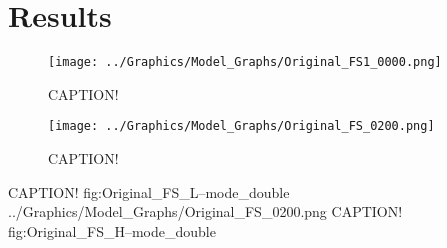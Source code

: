\chapter{Results}\label{chapter:results}

\begin{figure}[tb]
	\centering
	\texttt{[image: ../Graphics/Model\_Graphs/Original\_FS1\_0000.png]}
	\caption{CAPTION!}
	\label{fig:Original_FS_L--mode}
\end{figure}
\begin{figure}[tb]
	\centering
	\texttt{[image: ../Graphics/Model\_Graphs/Original\_FS\_0200.png]}
	\caption{CAPTION!}
	\label{fig:Original_FS_H--mode}
\end{figure}

	{CAPTION!}
	{fig:Original_FS_L--mode_double}
	{../Graphics/Model_Graphs/Original_FS_0200.png}
	{CAPTION!}
	{fig:Original_FS_H--mode_double}

